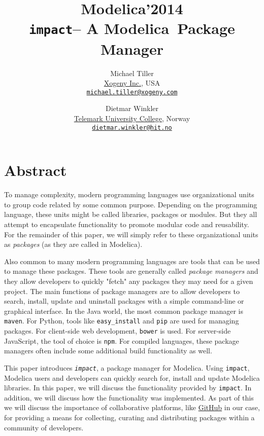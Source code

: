 \documentclass[11pt,a4paper,twocolumn]{article}
\newcommand{\myr}{\textsuperscript{\textregistered}}
\newcommand{\impact}{\texttt{impact}} %
\newcommand{\code}[1]{\texttt{#1}} %
\begin{document}
\title{\textbf{{\small Modelica'2014}\\
    \impact -- A Modelica\myr\ Package Manager}}

\author{Michael Tiller\\\href{http://xogeny.com}{Xogeny Inc.}, USA\\\href{mailto:michael.tiller@xogeny.com}{\nolinkurl{michael.tiller@xogeny.com}} %
        \and Dietmar Winkler\\\href{http://www.hit.no}{Telemark University College}, Norway\\\href{mailto:dietmar.winkler@hit.no}{\nolinkurl{dietmar.winkler@hit.no}}}
\date{} %
\maketitle\thispagestyle{empty} %

\section*{Abstract}

To manage complexity, modern programming languages use organizational
units to group code related by some common purpose.  Depending on the
programming language, these units might be called libraries, packages
or modules.  But they all attempt to encapsulate functionality to
promote modular code and reusability.  For the remainder of this
paper, we will simply refer to these organizational units as
\emph{packages} (as they are called in Modelica).

Also common to many modern programming languages are tools that can be
used to manage these packages.  These tools are generally called
\emph{package managers} and they allow developers to quickly "fetch" any
packages they may need for a given project.  The main functions of
package managers are to allow developers to search, install, update
and uninstall packages with a simple command-line or graphical
interface.  In the Java world, the most common package manager is
\code{maven}.  For Python, tools like \code{easy\_install} and \code{pip} are
used for managing packages.  For client-side web development,
\code{bower} is used.  For server-side JavaScript, the tool of choice is
\code{npm}.  For compiled languages, these package managers often
include some additional build functionality as well.

This paper introduces \emph{\impact}, a package manager for Modelica.
Using \impact, Modelica users and developers can quickly search
for, install and update Modelica libraries.  In this paper, we will
discuss the functionality provided by \impact.  In addition, we
will discuss how the functionality was implemented.  As part of this
we will discuss the importance of collaborative platforms, like
\href{https://github.com}{GitHub} in our case, for providing a means for collecting,
curating and distributing packages within a community of developers.
\end{document}
